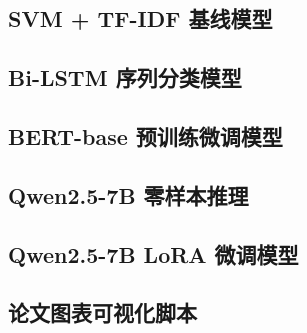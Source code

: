 \subsection{SVM + TF-IDF 基线模型}



\subsection{Bi-LSTM 序列分类模型}



\subsection{BERT-base 预训练微调模型}



\subsection{Qwen2.5-7B 零样本推理}



\subsection{Qwen2.5-7B LoRA 微调模型}



\subsection{论文图表可视化脚本}


